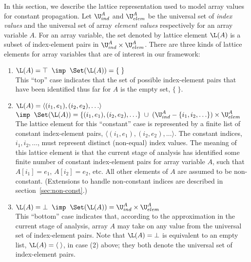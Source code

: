 In this section, we describe the lattice representation used to model
array values for constant propagation.
Let $\U^A_{ind}$ and $\U^A_{elem}$ be the universal set of {\it index values}
and the universal set of array {\it element values} respectively
for an array variable $A$.
For an array variable,
the set denoted by
lattice element $\L(A)$ is a subset of index-element pairs in $\U^A_{ind} \times \U^A_{elem}$.
There are three kinds of lattice elements for array variables that are of
interest in our framework:
\begin{enumerate}
\item $\L(A) = \top \;\;\imp\;\; \Set(\L(A)) = \{\;\}$\\
This ``top'' case indicates that the set of possible index-element
pairs
that have been identified thus far for $A$ is the empty set, $\{\;\}$.


\item $\L(A) = \langle(i_1,e_1), (i_2,e_2), \ldots\rangle$\\
$\imp\;\; \Set(\L(A)) = \{ (i_1,e_1), (i_2,e_2), \ldots \} \;\cup\;
(\U^A_{ind}-\{i_1,i_2,\ldots\})\times \U^A_{elem}$\\
The lattice element for this ``constant'' case is represented by a finite
list
of constant index-element pairs, $\langle(i_1,e_1), (i_2,e_2), \ldots\rangle$.
The constant indices, $i_1, i_2, \ldots$, must represent distinct (non-equal)
index values.  
The meaning of this lattice element is
that the current stage of analysis
has identified some finite number of constant index-element pairs
for array variable $A$, such
that $A[i_1] = e_1$, $A[i_2] = e_2$, etc.
All other elements of $A$ are assumed to be non-constant.
(Extensions to handle non-constant indices are
described in section~\ref{sec:non-const}.)

\item $\L(A) = \bot \;\;\imp\;\; \Set(\L(A)) =  \U^A_{ind} \times \U^A_{elem}$\\
This ``bottom''
case indicates that, according to
the approximation in the current stage of analysis, array $A$ may take on any
value from the universal set of index-element pairs.
Note that $\L(A)=\bot$ is equivalent to an empty list,
$\L(A)=\langle \; \rangle$, in case (2) above; they both 
denote the universal set of index-element pairs.
\end{enumerate}

